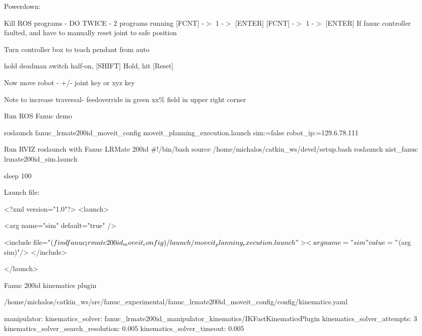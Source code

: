 Powerdown\-:
\begin{DoxyEnumerate}
\item Kill R\-O\-S programs -\/ D\-O T\-W\-I\-C\-E -\/ 2 programs running \mbox{[}F\-C\-N\-T\mbox{]} -\/$>$ 1 -\/$>$ \mbox{[}E\-N\-T\-E\-R\mbox{]} \mbox{[}F\-C\-N\-T\mbox{]} -\/$>$ 1 -\/$>$ \mbox{[}E\-N\-T\-E\-R\mbox{]} If fanuc controller faulted, and have to manually reset joint to safe position
\end{DoxyEnumerate}
\begin{DoxyEnumerate}
\item Turn controller box to teach pendant from auto
\item hold deadman switch half-\/on, \mbox{[}S\-H\-I\-F\-T\mbox{]} Hold, hit \mbox{[}Reset\mbox{]}
\item Now move robot -\/ +/-\/ joint key or xyz key
\item Note to increase traversal-\/ feedoverride in green xx\% field in upper right corner
\end{DoxyEnumerate}

Run R\-O\-S Fanuc demo \begin{DoxyVerb}roslaunch fanuc_lrmate200id_moveit_config  moveit_planning_execution.launch 
  sim:=false   robot_ip:=129.6.78.111
\end{DoxyVerb}


Run R\-V\-I\-Z roslaunch with Fanuc L\-R\-Mate 200id \#!/bin/bash source /home/michalos/catkin\-\_\-ws/devel/setup.bash roslaunch nist\-\_\-fanuc lrmate200id\-\_\-sim.\-launch

sleep 100

Launch file\-: \begin{DoxyVerb}<?xml version="1.0"?>
<launch>

  <arg name="sim" default="true" />

  <include file="$(find fanuc_lrmate200id_moveit_config)/launch/moveit_planning_execution.launch">
    <arg name="sim" value="$(arg sim)"/>
  </include>

</launch>
\end{DoxyVerb}


Fanuc 200id kinematics plugin

/home/michalos/catkin\-\_\-ws/src/fanuc\-\_\-experimental/fanuc\-\_\-lrmate200id\-\_\-moveit\-\_\-config/config/kinematics.yaml \begin{DoxyVerb}manipulator:
  kinematics_solver: fanuc_lrmate200id_manipulator_kinematics/IKFastKinematicsPlugin
  kinematics_solver_attempts: 3
  kinematics_solver_search_resolution: 0.005
  kinematics_solver_timeout: 0.005
\end{DoxyVerb}


